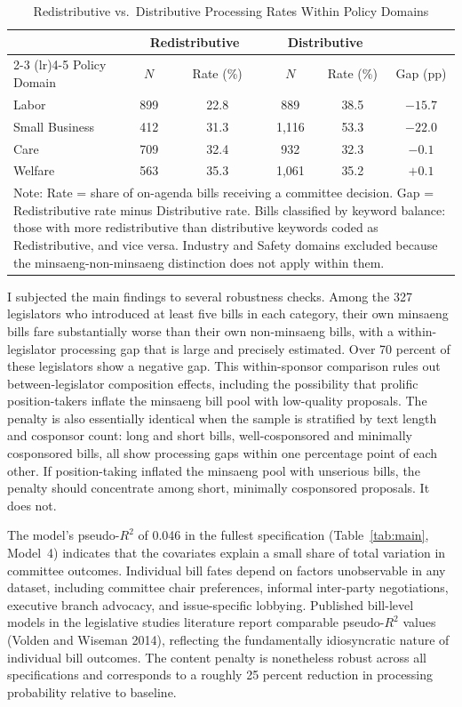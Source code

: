 \documentclass[11pt]{article}
\begin{document}
\begin{table}[H]
\centering
\caption{Redistributive vs.\ Distributive Processing Rates Within Policy Domains}
\label{tab:lowi}
\begin{tabular}{lccccc}
\toprule
& \multicolumn{2}{c}{Redistributive} & \multicolumn{2}{c}{Distributive} & \\
\cmidrule(lr){2-3} \cmidrule(lr){4-5}
Policy Domain & $N$ & Rate (\%) & $N$ & Rate (\%) & Gap (pp) \\
\midrule
Labor & 899 & 22.8 & 889 & 38.5 & $-15.7$ \\
Small Business & 412 & 31.3 & 1,116 & 53.3 & $-22.0$ \\
Care & 709 & 32.4 & 932 & 32.3 & $-0.1$ \\
Welfare & 563 & 35.3 & 1,061 & 35.2 & $+0.1$ \\
\bottomrule
\multicolumn{6}{p{0.90\textwidth}}{\footnotesize Note: Rate = share of on-agenda bills receiving a committee decision. Gap = Redistributive rate minus Distributive rate. Bills classified by keyword balance: those with more redistributive than distributive keywords coded as Redistributive, and vice versa. Industry and Safety domains excluded because the minsaeng-non-minsaeng distinction does not apply within them.} \\
\end{tabular}
\end{table}

I subjected the main findings to several robustness checks. Among the 327 legislators who introduced at least five bills in each category, their own minsaeng bills fare substantially worse than their own non-minsaeng bills, with a within-legislator processing gap that is large and precisely estimated. Over 70 percent of these legislators show a negative gap. This within-sponsor comparison rules out between-legislator composition effects, including the possibility that prolific position-takers inflate the minsaeng bill pool with low-quality proposals. The penalty is also essentially identical when the sample is stratified by text length and cosponsor count: long and short bills, well-cosponsored and minimally cosponsored bills, all show processing gaps within one percentage point of each other. If position-taking inflated the minsaeng pool with unserious bills, the penalty should concentrate among short, minimally cosponsored proposals. It does not.

The model's pseudo-$R^2$ of 0.046 in the fullest specification (Table~\ref{tab:main}, Model~4) indicates that the covariates explain a small share of total variation in committee outcomes. Individual bill fates depend on factors unobservable in any dataset, including committee chair preferences, informal inter-party negotiations, executive branch advocacy, and issue-specific lobbying. Published bill-level models in the legislative studies literature report comparable pseudo-$R^2$ values (Volden and Wiseman 2014), reflecting the fundamentally idiosyncratic nature of individual bill outcomes. The content penalty is nonetheless robust across all specifications and corresponds to a roughly 25 percent reduction in processing probability relative to baseline.
\end{document}
